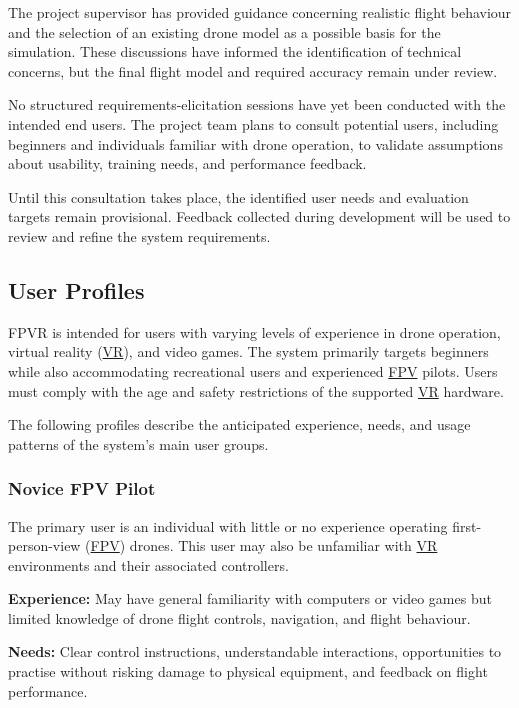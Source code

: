 \documentclass[12pt]{article}
\begin{document}
The project supervisor has provided guidance
concerning realistic flight behaviour and the
selection of an existing drone model as a possible
basis for the simulation. These discussions have
informed the identification of technical concerns,
but the final flight model and required accuracy
remain under review.

No structured requirements-elicitation sessions
have yet been conducted with the intended end users.
The project team plans to consult potential users,
including beginners and individuals familiar with
drone operation, to validate assumptions about
usability, training needs, and performance feedback.

Until this consultation takes place, the identified
user needs and evaluation targets remain provisional.
Feedback collected during development will be used
to review and refine the system requirements.

\subsection{User Profiles}\label{g8}

FPVR is intended for users with varying levels of
experience in drone operation, virtual reality (\hyperlink{glos:VR}{VR}),
and video games. The system primarily targets
beginners while also accommodating recreational
users and experienced \hyperlink{glos:FPV}{FPV} pilots. Users must comply
with the age and safety restrictions of the
supported \hyperlink{glos:VR}{VR} hardware.

The following profiles describe the anticipated
experience, needs, and usage patterns of the
system's main user groups.


\subsubsection{Novice FPV Pilot}
\label{sec:novice-user}

The primary user is an individual with little or
no experience operating first-person-view (\hyperlink{glos:FPV}{FPV})
drones. This user may also be unfamiliar with
\hyperlink{glos:VR}{VR} environments and their associated controllers.

\noindent\textbf{Experience:}
May have general familiarity with computers or
video games but limited knowledge of drone flight
controls, navigation, and flight behaviour.

\noindent\textbf{Needs:}
Clear control instructions, understandable
interactions, opportunities to practise without
risking damage to physical equipment, and
feedback on flight performance.
\end{document}
